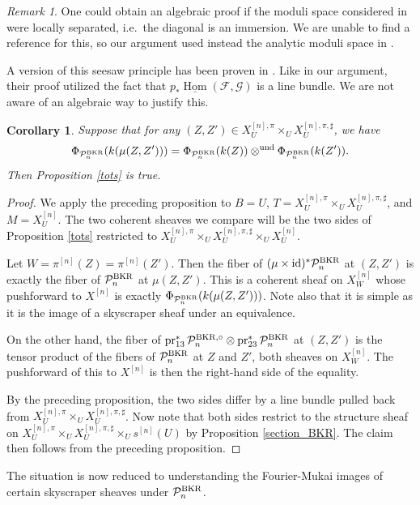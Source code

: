 \documentclass{amsart}
\theoremstyle{plain}
\newtheorem{corollary}[theorem]{Corollary}
\theoremstyle{definition}
\theoremstyle{remark}
\newtheorem{remark}[theorem]{Remark}
\begin{document}
    \begin{remark}
        One could obtain an algebraic proof if the moduli space considered in \cite[Theorem 7.4]{altklei} were locally separated, i.e.~the diagonal is an immersion.
        We are unable to find a reference for this, so our argument used instead the analytic moduli space in \cite{analyticsimplesheaves}.

        A version of this seesaw principle has been proven in \cite[Lemma 5.5]{mrv2}.
        Like in our argument, their proof utilized the fact that $p_\ast\underline{\operatorname{Hom}}(\mathcal F,\mathcal G)$ is a line bundle.
        We are not aware of an algebraic way to justify this.
    \end{remark}
    \begin{corollary}\label{fibercheck_tots}
        Suppose that for any $(Z,Z')\in X_U^{[n],\pi}\times_UX_U^{[n],\pi,\sharp}$, we have
        \[
        \Phi_{\mathcal P_n^{\rm BKR}}(k(\mu(Z,Z')))=\Phi_{\mathcal P_n^{\rm BKR}}(k(Z))\otimes^{\rm und}\Phi_{\mathcal P_n^{\rm BKR}}(k(Z')).
        \]
        Then Proposition \ref{tots} is true.
    \end{corollary}
    \begin{proof}
        We apply the preceding proposition to $B=U$, $T=X_U^{[n],\pi}\times_UX_U^{[n],\pi,\sharp}$, and $M=X_U^{[n]}$.
        The two coherent sheaves we compare will be the two sides of Proposition \ref{tots} restricted to $X^{[n],\pi}_U\times_UX^{[n],\pi,\sharp}_U\times_UX^{[n]}_U$.

        Let $W=\pi^{[n]}(Z)=\pi^{[n]}(Z')$.
        Then the fiber of $(\mu\times \operatorname{id})^\ast\mathcal P_n^{\rm BKR}$ at $(Z,Z')$ is exactly the fiber of $\mathcal P_n^{\rm BKR}$ at $\mu(Z,Z')$.
        This is a coherent sheaf on $X^{[n]}_{W}$ whose pushforward to $X^{[n]}$ is exactly $\Phi_{\mathcal P_n^{\rm BKR}}(k(\mu(Z,Z')))$.
        Note also that it is simple as it is the image of a skyscraper sheaf under an equivalence.

        On the other hand, the fiber of $\operatorname{pr}_{13}^\ast\mathcal P^{\rm BKR,\circ}_n\otimes\operatorname{pr}_{23}^\ast\mathcal P^{\rm BKR}_n$ at $(Z,Z')$ is the tensor product of the fibers of $\mathcal P_n^{\rm BKR}$ at $Z$ and $Z'$, both sheaves on $X_W^{[n]}$.
        The pushforward of this to $X^{[n]}$ is then the right-hand side of the equality.

        By the preceding proposition, the two sides differ by a line bundle pulled back from $X^{[n],\pi}_U\times_UX^{[n],\pi,\sharp}_U$.
        Now note that both sides restrict to the structure sheaf on $X^{[n],\pi}_U\times_UX^{[n],\pi,\sharp}_U\times_Us^{[n]}(U)$ by Proposition \ref{section_BKR}.
        The claim then follows from the preceding proposition.
    \end{proof}
    The situation is now reduced to understanding the Fourier-Mukai images of certain skyscraper sheaves under $\mathcal P_n^{\rm BKR}$.
\end{document}
